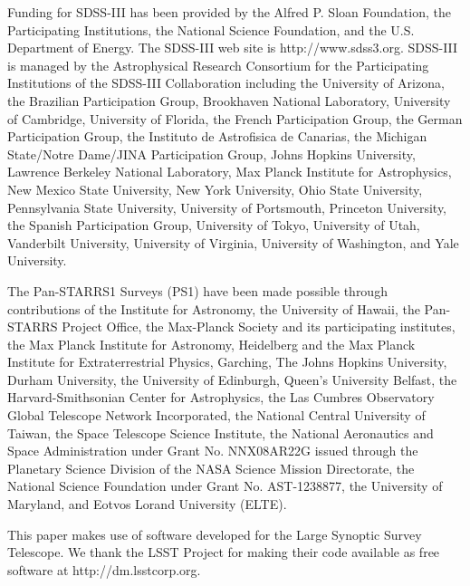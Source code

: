 \documentclass[a4paper,fleqn,usenatbib]{mnras}
\begin{document}
  Funding for SDSS-III has been provided by the Alfred P. Sloan Foundation, the
  Participating Institutions, the National Science Foundation, and the U.S.  Department of
  Energy. The SDSS-III web site is http://www.sdss3.org.  SDSS-III is managed by the
  Astrophysical Research Consortium for the Participating Institutions of the SDSS-III
  Collaboration including the University of Arizona, the Brazilian Participation Group,
  Brookhaven National Laboratory, University of Cambridge, University of Florida, the
  French Participation Group, the German Participation Group, the Instituto de Astrofisica
  de Canarias, the Michigan State/Notre Dame/JINA Participation Group, Johns Hopkins
  University, Lawrence Berkeley National Laboratory, Max Planck Institute for
  Astrophysics, New Mexico State University, New York University, Ohio State University,
  Pennsylvania State University, University of Portsmouth, Princeton University, the
  Spanish Participation Group, University of Tokyo, University of Utah, Vanderbilt
  University, University of Virginia, University of Washington, and Yale University.
  
  The Pan-STARRS1 Surveys (PS1) have been made possible through contributions of the 
  Institute for Astronomy, the University of Hawaii, the Pan-STARRS Project Office, 
  the Max-Planck Society and its participating institutes, the Max Planck Institute 
  for Astronomy, Heidelberg and the Max Planck Institute for Extraterrestrial Physics, 
  Garching, The Johns Hopkins University, Durham University, the University of Edinburgh, 
  Queen's University Belfast, the Harvard-Smithsonian Center for Astrophysics, the Las 
  Cumbres Observatory Global Telescope Network Incorporated, the National Central 
  University of Taiwan, the Space Telescope Science Institute, the National Aeronautics 
  and Space Administration under Grant No. NNX08AR22G issued through the Planetary 
  Science Division of the NASA Science Mission Directorate, the National Science 
  Foundation under Grant No. AST-1238877, the University of Maryland, and Eotvos 
  Lorand University (ELTE).
  
  This paper makes use of software developed for the Large Synoptic Survey 
  Telescope. We thank the LSST Project for making their code available as free 
  software at http://dm.lsstcorp.org.
 
\end{document}
